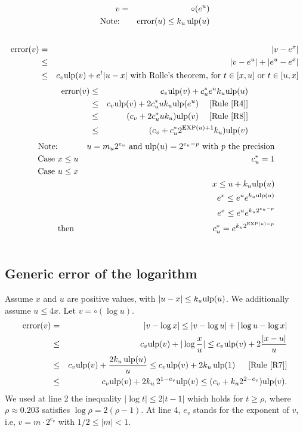 \documentclass[12pt]{amsart}
\def\n{\textnormal}
\def\ulp{{\rm ulp}}
\def\Exp{{\rm EXP}}
\newcommand{\U}[1]{\quad \mbox{[Rule~\ref{#1}]}}
\DeclareMathOperator{\error}{error}
\begin{document}
\begin{eqnarray}\nonumber
v&=&\circ(e^{u}) \\\nonumber
\textnormal{Note:}&& \error(u) \leq k_u \, \ulp(u)\\\nonumber
\end{eqnarray}
\begin{eqnarray}\nonumber
\error(v)& = &|v - e^{x}| \\\nonumber
& \leq &|v - e^{u}| +|e^{u} - e^{x}| \\\nonumber
& \leq & c_v \ulp(v) +  e^t |u-x| \n{ with Rolle's theorem, for } t\in[x,u]\n{ or }t\in[u,x]
\end{eqnarray}
\begin{eqnarray}\nonumber
\error(v)& \leq & c_v \ulp(v) +  c_u^* e^u k_u \ulp(u) \\\nonumber
& \leq & c_v \ulp(v) +  2 c_u^* u k_u \ulp(e^u) \;\U{R4}\\\nonumber
& \leq & (c_v +  2 c_u^* u k_u )\ulp(v) \;\U{R8}\\\nonumber
& \leq & (c_v +  c_u^* 2^{\Exp(u)+1} k_u )\ulp(v)
\end{eqnarray}
\begin{eqnarray}\nonumber
\textnormal{Note:}&& u= m_u 2^{e_u} \n{ and }\ulp(u)=2^{e_u-p} \n{ with } p \n{ the precision} \\\nonumber
\n{ Case }&x \leq u&  c_u^* =1 \\\nonumber
\n{ Case }&u \leq x& \\\nonumber
&&  x \leq u + k_u \ulp(u)\\\nonumber
&& e^x \leq e^u e^{k_u \ulp(u)}\\\nonumber
&&e^x \leq e^u e^{k_u 2^{e_u-p}}\\\nonumber
&\n{then}& c_u^* = e^{k_u 2^{\Exp(u)-p}}\\\nonumber
\end{eqnarray}

\subsection{Generic error of the logarithm}\label{generic:log}
Assume $x$ and $u$ are positive values,
with $|u - x| \leq k_u \ulp(u)$.
We additionally assume $u \leq 4x$. Let $v = \circ(\log u)$.
\begin{eqnarray}\nonumber
\error(v)& = &|v - \log x|
  \leq |v - \log u| +|\log u - \log x| \\\nonumber
& \leq & c_v \ulp(v) + |\log\frac{x}{u}|
  \leq   c_v \ulp(v) + 2 \frac{|x-u|}{u} \\\nonumber
& \leq & c_v \ulp(v) + \frac{2 k_u \, \ulp(u)}{u}
  \leq   c_v \ulp(v) + 2 k_u \, \ulp(1)\;\; \U{R7}\\\nonumber
& \leq & c_v \ulp(v) + 2 k_u \, 2^{1-e_v} \ulp(v)
  \leq   (c_v + k_u 2^{2-e_v}) \ulp(v).
\end{eqnarray}
We used at line 2 the inequality $|\log t| \leq 2 |t-1|$ which holds
for $t \geq \rho$, where $\rho \approx 0.203$ satisfies $\log \rho =2(\rho-1)$.
At line 4, $e_v$ stands for the exponent of $v$, i.e,
$v = m \cdot 2^{e_v}$ with $1/2 \leq |m| < 1$.
\end{document}
